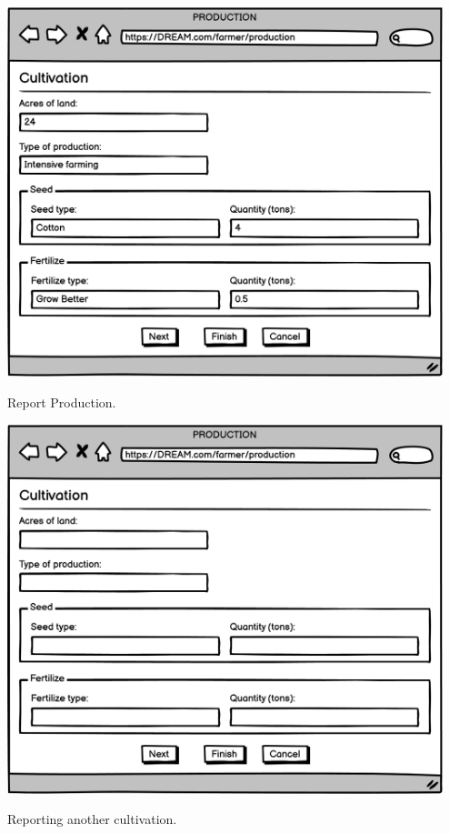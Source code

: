 \vspace{0.5cm}
\begin{minipage}{.5\textwidth}
	\centering
	\includegraphics[width=0.95\textwidth]{Images/Mockup/Farmer/15FarmerProduction.png}
	\captionsetup{type=figure}
	\caption{Report Production.}
\end{minipage}%
\begin{minipage}{.5\textwidth}
	\centering
	\includegraphics[width=0.95\textwidth]{Images/Mockup/Farmer/16FarmerProductionNew.png}
	\captionsetup{type=figure}
	\caption{Reporting another cultivation.}
\end{minipage}
